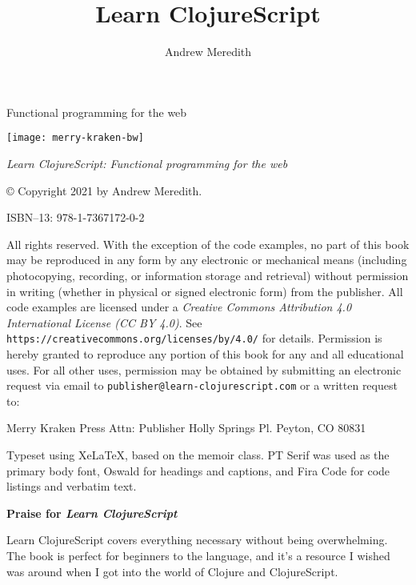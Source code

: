 \documentclass[10pt,twoside,openright]{memoir}
\author{Andrew Meredith}
\title{Learn ClojureScript}
\date{}
\makeatletter
\newcommand{\subTitle}{Functional programming for the web}
\def\maketitle{%
  \null
  \thispagestyle{empty}%
  \begin{center}\leavevmode
    \begin{flushright}
    \normalfont
    {\Huge\textbf{\textsf{\@title}}\par}%
    \hrulefill\par
    {\LARGE\textsf{\subTitle}\par}%
    \vskip 4.5cm
    {\LARGE\textbf{\@author}\par}%
    \vskip 4.5cm
    \texttt{[image: merry-kraken-bw]}
    \end{flushright}
  \end{center}%
  \vfill
  \null
  \cleardoublepage
  }
\makeatother
\begin{document}
\maketitle

\frontmatter

\null\vfill

\begin{flushleft}
\textit{Learn ClojureScript: Functional programming for the web}


© Copyright 2021 by Andrew Meredith.


ISBN--13: 978-1-7367172-0-2

\bigskip
All rights reserved. With the exception of the code examples, no part of this book may be reproduced in any form by any electronic or mechanical means (including photocopying, recording, or information storage and retrieval) without permission in writing (whether in physical or signed electronic form) from the publisher. All code examples are licensed under a \emph{Creative Commons Attribution 4.0 International License (CC BY 4.0)}. See \texttt{https://creativecommons.org/licenses/by/4.0/} for details. Permission is hereby granted to reproduce any portion of this book for any and all educational uses. For all other uses, permission may be obtained by submitting an electronic request via email to \texttt{publisher@learn-clojurescript.com} or a written request to:

\bigskip
Merry Kraken Press\linebreak
Attn: Publisher Holly Springs Pl.\linebreak
Peyton, CO 80831\linebreak

\bigskip
Typeset using XeLaTeX, based on the memoir class. PT Serif was used as the primary body font, Oswald for headings and captions, and Fira Code for code listings and verbatim text.

\end{flushleft}

\clearpage

\thispagestyle{empty}%
\begin{flushright}
\normalfont
{\Large\textbf{\textsf{Praise for \emph{Learn ClojureScript}}}\par}%
\hrulefill\par
\vskip 2cm

\begin{fquote}Learn ClojureScript covers everything necessary without being overwhelming. The book is perfect for beginners to the language, and it's a resource I wished was around when I got into the world of Clojure and ClojureScript.
\end{fquote}

\end{flushright}
\vfill
\end{document}
